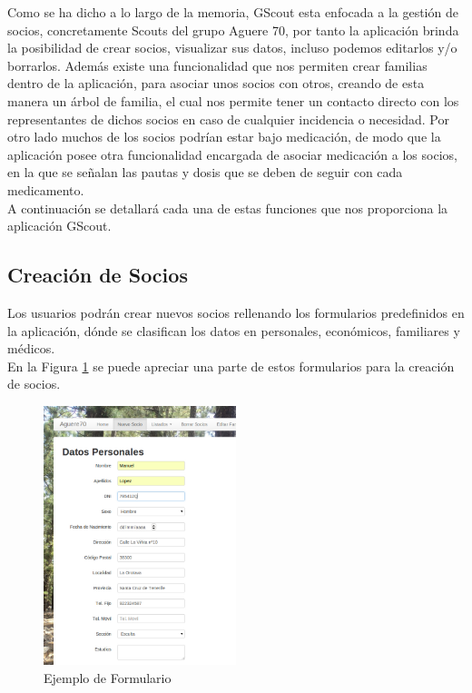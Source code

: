 Como se ha dicho a lo largo de la memoria, GScout esta enfocada a la gestión de socios, concretamente Scouts del grupo Aguere 70, 
por tanto la aplicación brinda la posibilidad de crear socios, visualizar sus datos, incluso podemos editarlos y/o borrarlos. Además existe una funcionalidad que nos permiten 
crear familias dentro de la aplicación, para asociar unos socios con otros, creando de esta manera un árbol de familia, el cual nos permite tener un contacto directo con los representantes de dichos
socios en caso de cualquier incidencia o necesidad. Por otro lado muchos de los socios podrían estar bajo medicación, de modo que la aplicación posee otra funcionalidad encargada de asociar medicación a los socios,
en la que se señalan las pautas y dosis que se deben de seguir con cada medicamento.\\

A continuación se detallará cada una de estas funciones que nos proporciona la aplicación GScout.\\

\subsection{Creación de Socios}

Los usuarios podrán crear nuevos socios rellenando los formularios predefinidos en la aplicación, dónde se clasifican los datos en personales, económicos, familiares y médicos.\\

En la Figura \ref{fig:form} se puede apreciar una parte de estos formularios para la creación de socios.

\begin{figure}[H]
\begin{center}
\includegraphics[width=0.5\textwidth]{images/ejemplo_formulario_personal.jpg}
\caption{Ejemplo de Formulario}
\label{fig:form}
\end{center}
\end{figure}

